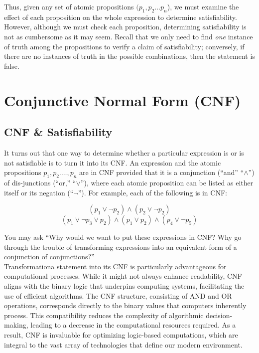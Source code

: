 \documentclass{article}
\def \subheaderSpace {10pt}
\begin{document}
            \noindent Thus, given any set of atomic propositions $(p_1, p_2\dots p_n$), we must examine the effect of each proposition on the whole expression to determine satisfiability. However, although we must check each proposition, determining satisfiability is not as cumbersome as it may seem. Recall that we only need to find \textit{one} instance of truth among the propositions to verify a claim of satisfiability; conversely, if there are no instances of truth in the possible combinations, then the statement is false.    



\newpage



\section{Conjunctive Normal Form (CNF)}


        \subsection{CNF \& Satisfiability}

            \vspace{\subheaderSpace}
        
            It turns out that one way to determine whether a particular expression is or is not satisfiable is to turn it into its CNF. An expression and the atomic propositions $p_1,p_2.\dots,p_n$ are in CNF provided that it is a conjunction (``and'' ``$\land$'') of dis-junctions (``or,'' ``$\lor$''), where each atomic proposition can be listed as either itself or its negation (``$\neg$''). For example, each of the following is in CNF: 
            
            $$(p_1 \lor \neg p_2) \land (p_2 \lor \neg p_2)$$
            $$(p_1 \lor \neg p_3 \lor p_2) \land (p_1 \lor p_2) \land (p_4 \lor \neg p_5)$$ 

            \noindent You may ask ``Why would we want to put these expressions in CNF? Why go through the trouble of transforming expressions into an equivalent form of a conjunction of conjunctions?'' \\
            
            \noindent Transformationa statement into its CNF is particularly advantageous for computational processes. While it might not always enhance readability, CNF aligns with the binary logic that underpins computing systems, facilitating the use of efficient algorithms. The CNF structure, consisting of AND and OR operations, corresponds directly to the binary values that computers inherently process. This compatibility reduces the complexity of algorithmic decision-making, leading to a decrease in the computational resources required. As a result, CNF is invaluable for optimizing logic-based computations, which are integral to the vast array of technologies that define our modern environment.
\end{document}
